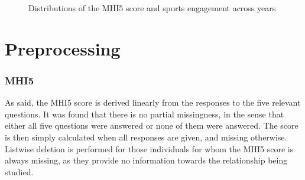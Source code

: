\begin{figure}[htbp]
    \begin{subfigure}[t]{0.49\textwidth}
        \centering
        
        \vspace{0.1em}
    \end{subfigure}
    \hfill
    \begin{subfigure}[t]{0.49\textwidth}
        \centering
        
        \vspace{0.1em}
    \end{subfigure}
    \caption{Distributions of the MHI5 score and sports engagement across years}
    \label{fig:data:sample_moments_y_x}
\end{figure}

\section{Preprocessing}
\label{sec:data:preprocessing}
\subsubsection{MHI5}
As said, the MHI5 score is derived linearly from the responses to the five relevant questions. It was found that
there is no partial missingness, in the sense that either all five questions were answered or none of them were answered.
The score is then simply calculated when all responses are given, and missing otherwise.
Listwise deletion is performed for those individuals for whom the MHI5 score is always missing, as they provide no
information towards the relationship being studied.

